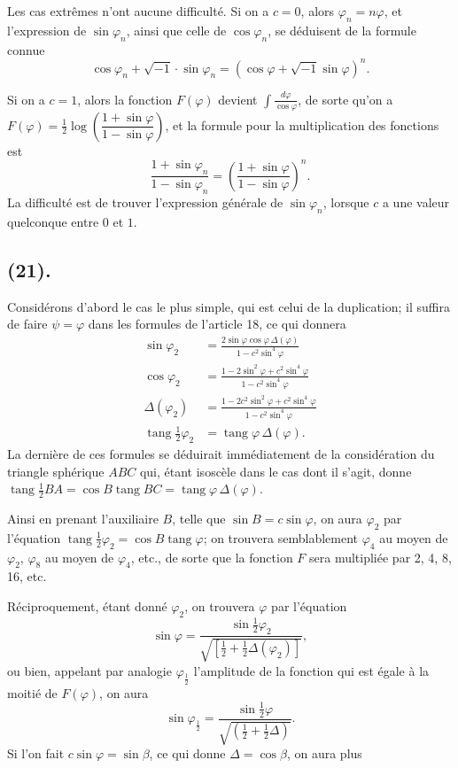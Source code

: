 \documentclass{article}
\begin{document}
Les cas extrêmes n'ont aucune difficulté. Si on a $c=0$, alors $\varphi_{n}=n\varphi$, et l'expression de $\sin\varphi_{n}$, ainsi que celle de $\cos\varphi_{n}$, se déduisent de la formule connue
\[ \cos\varphi_{n}+\sqrt{-1}\cdot\sin\varphi_{n}=(\cos\varphi+\sqrt{-1}\sin\varphi)^{n}. \]

Si on a $c=1$, alors la fonction $F(\varphi)$ devient $\displaystyle\int\frac{d\varphi}{\cos\varphi}$, de sorte qu'on a $F(\varphi)=\frac{1}{2}\log\left(\dfrac{1+\sin\varphi}{1-\sin\varphi}\right)$, et la formule pour la multiplication des fonctions est
\[ \frac{1+\sin\varphi_{n}}{1-\sin\varphi_{n}}=\left(\frac{1+\sin\varphi}{1-\sin\varphi}\right)^{n}. \]
La difficulté est de trouver l'expression générale de $\sin\varphi_{n}$, lorsque $c$ a une valeur quelconque entre $0$ et $1$.

\subsection*{(21).}

Considérons d'abord le cas le plus simple, qui est celui de la duplication; il suffira de faire $\psi=\varphi$ dans les formules de l'article 18, ce qui donnera
\[ \begin{aligned} \sin\varphi_{2} &= \frac{2\sin\varphi\cos\varphi\,\Delta(\varphi)}{1-c^{2}\sin^{4}\varphi} \\ \cos\varphi_{2} &= \frac{1-2\sin^{2}\varphi+c^{2}\sin^{4}\varphi}{1-c^{2}\sin^{4}\varphi} \\ \Delta(\varphi_{2}) &= \frac{1-2c^{2}\sin^{2}\varphi+c^{2}\sin^{4}\varphi}{1-c^{2}\sin^{4}\varphi} \\ \operatorname{tang}\tfrac{1}{2}\varphi_{2} &= \operatorname{tang}\varphi\,\Delta(\varphi). \end{aligned} \]
La dernière de ces formules se déduirait immédiatement de la considération du triangle sphérique $ABC$ qui, étant isoscèle dans le cas dont il s'agit, donne $\operatorname{tang}\frac{1}{2}BA=\cos B\operatorname{tang}BC=\operatorname{tang}\varphi\,\Delta(\varphi)$.

Ainsi en prenant l'auxiliaire $B$, telle que $\sin B=c\sin\varphi$, on aura $\varphi_{2}$ par l'équation $\operatorname{tang}\frac{1}{2}\varphi_{2}=\cos B\operatorname{tang}\varphi$; on trouvera semblablement $\varphi_{4}$ au moyen de $\varphi_{2}$, $\varphi_{8}$ au moyen de $\varphi_{4}$, etc., de sorte que la fonction $F$ sera multipliée par 2, 4, 8, 16, etc.

Réciproquement, étant donné $\varphi_{2}$, on trouvera $\varphi$ par l'équation
\[ \sin\varphi=\frac{\sin\frac{1}{2}\varphi_{2}}{\sqrt{[\frac{1}{2}+\frac{1}{2}\Delta(\varphi_{2})]}}, \]
ou bien, appelant par analogie $\varphi_{\frac{1}{2}}$ l'amplitude de la fonction qui est égale à la moitié de $F(\varphi)$, on aura
\[ \sin\varphi_{\frac{1}{2}}=\frac{\sin\frac{1}{2}\varphi}{\sqrt{(\frac{1}{2}+\frac{1}{2}\Delta)}}. \]
Si l'on fait $c\sin\varphi=\sin\beta$, ce qui donne $\Delta=\cos\beta$, on aura plus
\end{document}
